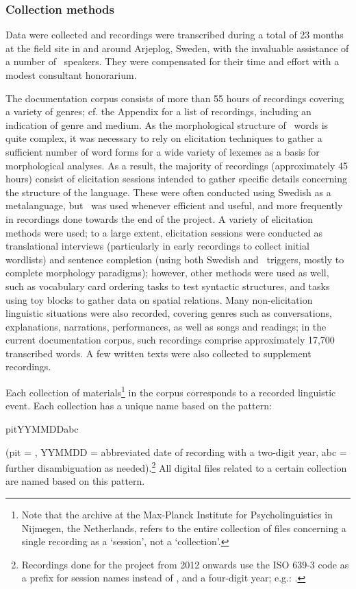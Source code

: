 \subsubsection{Collection methods}\label{collectionMethods}
Data were collected and recordings were transcribed during a total of 23 months at the field site in and around Arjeplog, Sweden, %
with the invaluable assistance of a number of \PS\ speakers. They were compensated for their time and effort with a modest consultant honorarium. 

The documentation corpus consists of more than 55 hours of recordings covering a variety of genres; cf. the Appendix for a list of recordings, including an indication of genre and medium. 
As the morphological structure of \PS\ words is quite complex, %
it was necessary to rely on elicitation techniques to gather a sufficient number of word forms for a wide variety of lexemes as a basis for morphological analyses. 
As a result, the majority of recordings (approximately 45 hours) consist of elicitation sessions intended to gather specific details concerning the structure of the language. 
These were often conducted using Swedish as a metalanguage, but \PS\ was used whenever efficient and useful, and more frequently in recordings done towards the end of the project. 
A variety of elicitation methods were used; to a large extent, elicitation sessions were conducted as translational interviews (particularly in early recordings to collect initial wordlists) and sentence completion (using both Swedish and \PS\ triggers, mostly to complete morphology paradigms); however, other methods were used as well, such as vocabulary card ordering tasks to test syntactic structures, and tasks using toy blocks to gather data on spatial relations. 
Many non-elicitation linguistic situations were also recorded, covering genres such as conversations, explanations, narrations, performances, as well as songs and readings; in the current documentation corpus, such recordings comprise approximately 17,700 transcribed words. A few written texts were also collected to supplement recordings. 

Each collection of materials\footnote{Note that the archive at the Max-Planck Institute for Psycholinguistics in Nijmegen, the Netherlands, refers to the entire collection of files concerning a single recording as a ‘session’, not a ‘collection’.} 
in the corpus corresponds to a recorded linguistic event. Each collection has a unique name based on the pattern:
\begin{center} pitYYMMDDabc \end{center}
(pit = \PS, YYMMDD = abbreviated date of recording with a two-digit year, abc = further disambiguation as needed).\footnote{Recordings done for the project from 2012 onwards use the ISO 639-3 code  as a prefix for session names instead of , and a four-digit year; e.g.: .} 
All digital files related to a certain collection are named based on this pattern. 

